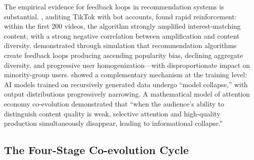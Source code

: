 \documentclass[12pt,a4paper]{article}
\begin{document}
The empirical evidence for feedback loops in recommendation systems is substantial. \textcite{Baumann2026}, auditing TikTok with bot accounts, found rapid reinforcement: within the first 200 videos, the algorithm strongly amplified interest-matching content, with a strong negative correlation between amplification and content diversity. \textcite{Mansoury2020} demonstrated through simulation that recommendation algorithms create feedback loops producing ascending popularity bias, declining aggregate diversity, and progressive user homogenization---with disproportionate impact on minority-group users. \textcite{Shumailov2024} showed a complementary mechanism at the training level: AI models trained on recursively generated data undergo ``model collapse,'' with output distributions progressively narrowing. A mathematical model of attention economy co-evolution \parencite{LiZhang2026} demonstrated that ``when the audience's ability to distinguish content quality is weak, selective attention and high-quality production simultaneously disappear, leading to informational collapse.''

\subsection{The Four-Stage Co-evolution Cycle}
\end{document}
